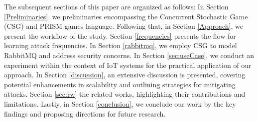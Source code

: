 The subsequent sections of this paper are organized as follows: In Section \ref{Preliminaries}, we  preliminaries encompassing the Concurrent Stochastic Game (CSG) and PRISM-games language. Following that, in Section \ref{Approach}, we present the workflow of the study. Section \ref{frequencies} presents the flow for learning attack frequencies. In Section \ref{rabbitmq}, we employ CSG to model RabbitMQ and address security concerns. In Section \ref{sec:useCase}, we conduct an experiment within the context of IoT systems for the practical application of our approach. In Section \ref{discussion}, an extensive discussion is presented, covering potential enhancements in scalability and outlining strategies for mitigating attacks. Section \ref{sec:rw}  the related works, highlighting their contributions and limitations. Lastly, in Section \ref{conclusion}, we conclude our work by  the key findings and proposing directions for future research.
